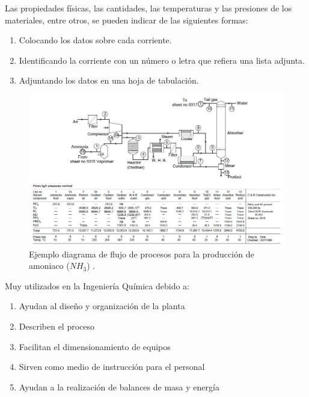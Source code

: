             Las propiedades físicas, las cantidades, las temperaturas y las presiones de los materiales, entre otros, se pueden indicar de las siguientes formas:
            \begin{enumerate}
                \item Colocando los datos sobre cada corriente.
                \item Identificando la corriente con un número o letra que refiera una lista adjunta.
                \item Adjuntando los datos en una hoja de tabulación.
            \end{enumerate}
            
            \begin{figure}
                \centering
                \includegraphics[width=\textwidth]{img/esquemas/diagrama_flux_ej.png}
                \caption[Ejemplo diagrama de flujo de procesos]{Ejemplo diagrama de flujo de procesos para la producción de amoniaco (\(NH_{3}\)) \cite{towler_chemical_2013}.}
                \label{fig:diag_flux_ej}
            \end{figure}
            
            Muy utilizados en la Ingeniería Química debido a:
            
            \begin{enumerate}
                \item Ayudan al diseño y organización de la planta
                \item Describen el proceso
                \item Facilitan el dimensionamiento de equipos
                \item Sirven como medio de instrucción para el personal
                \item Ayudan a la realización de balances de masa y energía
            \end{enumerate}
            
